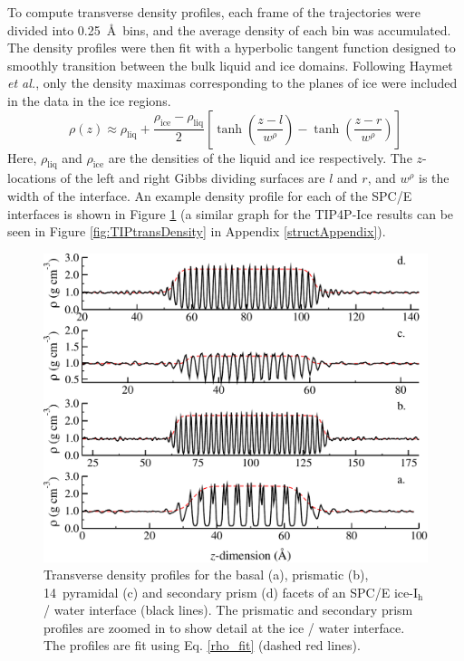 To compute transverse density profiles, each frame of the trajectories
were divided into 0.25~\AA~bins, and the average density of each bin
was accumulated. The density profiles were then fit with a hyperbolic
tangent function designed to smoothly transition between the bulk
liquid and ice domains. Following Haymet \textit{et al.}, only the
density maximas corresponding to the planes of ice were included in
the data in the ice regions.
\begin{equation}\label{rho_fit}
\rho (z) \approx
\rho_\mathrm{liq}+\frac{\rho_\mathrm{ice}-\rho_\mathrm{liq}}{2}\left[\tanh\left(\frac{z-l}{w^\rho}\right)-\tanh\left(\frac{z-r}{w^\rho}\right)\right]
\end{equation}
Here, $\rho_\mathrm{liq}$ and $\rho_\mathrm{ice}$ are the densities of
the liquid and ice respectively. The $z$-locations of the left and
right Gibbs dividing surfaces are $l$ and $r$, and $w^\rho$ is the
width of the interface. An example density profile for each of the
SPC/E interfaces is shown in Figure \ref{fig:transDensity} (a similar
graph for the TIP4P-Ice results can be seen in Figure
\ref{fig:TIPtransDensity} in Appendix \ref{structAppendix}).

\begin{figure}[H]
\includegraphics[width=\linewidth]{Figures/transDensity}
\caption{\label{fig:transDensity}Transverse density profiles for the
  basal (a), prismatic (b), 14\degree~pyramidal (c) and secondary prism (d)
  facets of an SPC/E ice-I$_\mathrm{h}$ / water interface (black
  lines). The prismatic and secondary prism profiles are zoomed in to
  show detail at the ice / water interface. The profiles are fit using
  Eq. \eqref{rho_fit} (dashed red lines).}
\end{figure}

